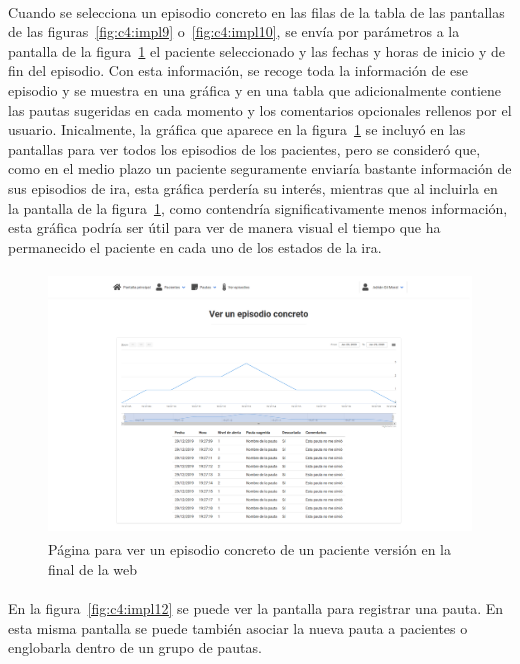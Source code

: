 \paragraph{}
Cuando se selecciona un episodio concreto en las filas de la tabla de las pantallas de las figuras~\ref{fig:c4:impl9} o~\ref{fig:c4:impl10}, se envía por parámetros a la pantalla de la figura~\ref{fig:c4:impl11} el paciente seleccionado y las fechas y horas de inicio y de fin del episodio. Con esta información, se recoge toda la información de ese episodio y se muestra en una gráfica y en una tabla que adicionalmente contiene las pautas sugeridas en cada momento y los comentarios opcionales rellenos por el usuario. Inicalmente, la gráfica que aparece en la figura~\ref{fig:c4:impl11} se incluyó en las pantallas para ver todos los episodios de los pacientes, pero se consideró que, como en el medio plazo un paciente seguramente enviaría bastante información de sus episodios de ira, esta gráfica perdería su interés, mientras que al incluirla en la pantalla de la figura~\ref{fig:c4:impl11}, como contendría significativamente menos información, esta gráfica podría ser útil para ver de manera visual el tiempo que ha permanecido el paciente en cada uno de los estados de la ira.

\begin{figure}[h]
    \centering
    \includegraphics[height=7cm, width=\textwidth]{Imagenes/7-verUnEpisodio.png}
    \caption[Página para ver un episodio concreto de un paciente en la versión final de la web]{Página para ver un episodio concreto de un paciente versión en la final de la web}
    \label{fig:c4:impl11}
\end{figure}

\paragraph{}
En la figura~\ref{fig:c4:impl12} se puede ver la pantalla para registrar una pauta. En esta misma pantalla se puede también asociar la nueva pauta a pacientes o englobarla dentro de un grupo de pautas.

